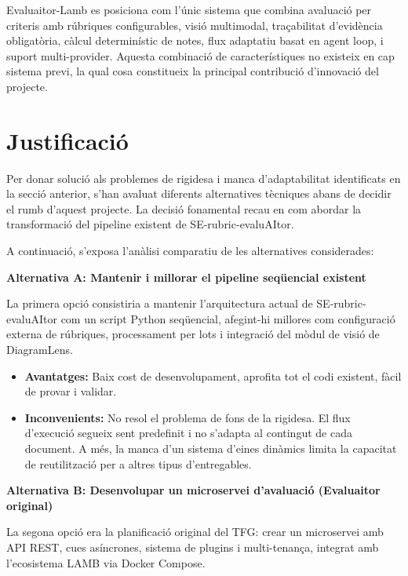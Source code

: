 \documentclass[12pt,a4paper,twoside]{report}
\begin{document}
Evaluaitor-Lamb es posiciona com l'\'unic sistema que combina avaluaci\'o per criteris amb r\'ubriques configurables, visi\'o multimodal, tra\c{c}abilitat d'evid\`encia obligat\`oria, c\`alcul determin\'istic de notes, flux adaptatiu basat en agent loop, i suport multi-provider. Aquesta combinaci\'o de caracter\'istiques no existeix en cap sistema previ, la qual cosa constitueix la principal contribuci\'o d'innovaci\'o del projecte.

\chapter{Justificaci\'o}
\label{chap:justificacio}

Per donar soluci\'o als problemes de rigidesa i manca d'adaptabilitat identificats en la secci\'o anterior, s'han avaluat diferents alternatives t\`ecniques abans de decidir el rumb d'aquest projecte. La decisi\'o fonamental recau en com abordar la transformaci\'o del pipeline existent de SE-rubric-evaluAItor.

A continuaci\'o, s'exposa l'an\`alisi comparatiu de les alternatives considerades:

\textbf{Alternativa A: Mantenir i millorar el pipeline seq\"uencial existent}

La primera opci\'o consistiria a mantenir l'arquitectura actual de SE-rubric-evaluAItor com un script Python seq\"uencial, afegint-hi millores com configuraci\'o externa de r\'ubriques, processament per lots i integraci\'o del m\`odul de visi\'o de DiagramLens.

\begin{itemize}
    \item \textbf{Avantatges:} Baix cost de desenvolupament, aprofita tot el codi existent, f\`acil de provar i validar.
    \item \textbf{Inconvenients:} No resol el problema de fons de la rigidesa. El flux d'execuci\'o segueix sent predefinit i no s'adapta al contingut de cada document. A m\'es, la manca d'un sistema d'eines din\`amics limita la capacitat de reutilitzaci\'o per a altres tipus d'entregables.
\end{itemize}

\textbf{Alternativa B: Desenvolupar un microservei d'avaluaci\'o (Evaluaitor original)}

La segona opci\'o era la planificaci\'o original del TFG: crear un microservei amb API REST, cues as\'incrones, sistema de plugins i multi-tenan\c{c}a, integrat amb l'ecosistema LAMB via Docker Compose.
\end{document}

